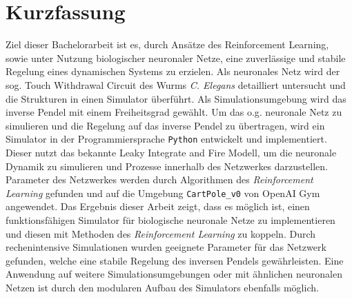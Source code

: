 \section*{Kurzfassung}
%
Ziel dieser Bachelorarbeit ist es, durch Ansätze des Reinforcement Learning, sowie unter Nutzung biologischer neuronaler Netze, eine zuverlässige und stabile Regelung eines dynamischen Systems zu erzielen. Als neuronales Netz wird der sog. \glqq Touch Withdrawal Circuit\grqq{} des Wurms \textit{C. Elegans} detailliert untersucht und die Strukturen in einen Simulator überführt. Als Simulationsumgebung wird das inverse Pendel mit einem Freiheitsgrad gewählt. Um das o.g. neuronale Netz zu simulieren und die Regelung auf das inverse Pendel zu übertragen, wird ein Simulator in der Programmiersprache \texttt{Python} entwickelt und implementiert. Dieser nutzt das bekannte Leaky Integrate and Fire Modell, um die neuronale Dynamik zu simulieren und Prozesse innerhalb des Netzwerkes darzustellen. Parameter des Netzwerkes werden durch Algorithmen des \textit{Reinforcement Learning} gefunden und auf die Umgebung \texttt{CartPole\_v0} von OpenAI Gym angewendet. Das Ergebnis dieser Arbeit zeigt, dass es möglich ist, einen funktionsfähigen Simulator für biologische neuronale Netze zu implementieren und diesen mit Methoden des \textit{Reinforcement Learning} zu koppeln. Durch rechenintensive Simulationen wurden geeignete Parameter für das Netzwerk gefunden, welche eine stabile Regelung des inversen Pendels gewährleisten. Eine Anwendung auf weitere Simulationsumgebungen oder mit ähnlichen neuronalen Netzen ist durch den modularen Aufbau des Simulators ebenfalls möglich.

